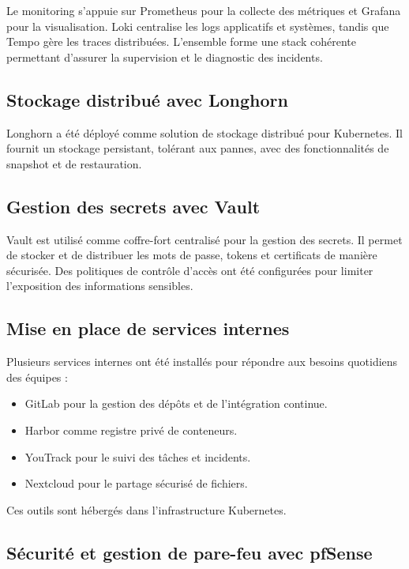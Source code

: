 Le monitoring s’appuie sur Prometheus pour la collecte des métriques et Grafana pour la visualisation. Loki centralise les logs applicatifs et systèmes, tandis que Tempo gère les traces distribuées. L’ensemble forme une stack cohérente permettant d’assurer la supervision et le diagnostic des incidents.

\subsection{Stockage distribué avec Longhorn}

Longhorn a été déployé comme solution de stockage distribué pour Kubernetes. Il fournit un stockage persistant, tolérant aux pannes, avec des fonctionnalités de snapshot et de restauration.

\subsection{Gestion des secrets avec Vault}

Vault est utilisé comme coffre-fort centralisé pour la gestion des secrets. Il permet de stocker et de distribuer les mots de passe, tokens et certificats de manière sécurisée. Des politiques de contrôle d’accès ont été configurées pour limiter l’exposition des informations sensibles.

\subsection{Mise en place de services internes}

Plusieurs services internes ont été installés pour répondre aux besoins quotidiens des équipes :

\begin{itemize}
  \item GitLab pour la gestion des dépôts et de l’intégration continue.
  \item Harbor comme registre privé de conteneurs.
  \item YouTrack pour le suivi des tâches et incidents.
  \item Nextcloud pour le partage sécurisé de fichiers.
\end{itemize}

Ces outils sont hébergés dans l’infrastructure Kubernetes.

\subsection{Sécurité et gestion de pare-feu avec pfSense}

